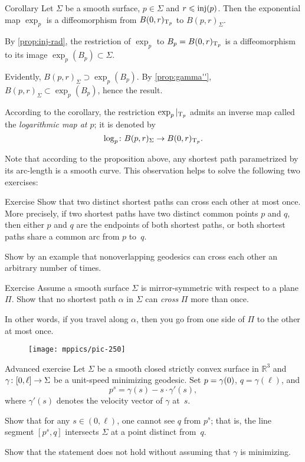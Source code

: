 \begin{thm}{Corollary}
Let $\Sigma$ be a smooth surface, $p\in\Sigma$ and $r\z\le \inj(p)$.
Then the exponential map $\exp_p$ is a diffeomorphism from $B(0,r)_{\mathrm{T}_p}$ to $B(p,r)_\Sigma$.
\end{thm}

By \ref{prop:inj-rad}, the restriction of $\exp_p$ to $B_p={B(0,r)_{\mathrm{T}_p}}$ is a diffeomorphism to its image $\exp_p(B_p)\subset \Sigma$.

Evidently, $B(p,r)_\Sigma\supset\exp_p(B_p)$.
By \ref{prop:gamma''}, $B(p,r)_\Sigma\subset\exp_p(B_p)$, hence the result.
\qeds

According to the corollary, the restriction $\exp_p|_{\mathrm{T}_p}$ admits an inverse map called the \emph{logarithmic map at $p$};
it is denoted by \[\log_p\colon B(p,r)_\Sigma\to B(0,r)_{\mathrm{T}_p}.\]

Note that according to the proposition above, any shortest path parametrized by its arc-length is a smooth curve.
This observation helps to solve the following two exercises:

\begin{thm}{Exercise}\label{ex:two-min-geod}
Show that two distinct shortest paths can cross each other at most once.
More precisely, if two shortest paths have two distinct common points $p$ and $q$, then either $p$ and $q$ are the endpoints of both shortest paths, or both shortest paths share a common arc from $p$ to~$q$.

Show by an example that nonoverlapping geodesics can cross each other an arbitrary number of times.
\end{thm}

\begin{thm}{Exercise}\label{ex:min-geod+plane}
Assume a smooth surface $\Sigma$ is mirror-symmetric with respect to a plane $\Pi$.
Show that no shortest path $\alpha$ in $\Sigma$ can {}\emph{cross} $\Pi$ more than once.


In other words, if you travel along $\alpha$, then you go from one side of $\Pi$ to the other at most once. 
\end{thm}

{

\begin{wrapfigure}{r}{40 mm}
\vskip-10mm
\centering
\texttt{[image: mppics/pic-250]}
\vskip-0mm
\end{wrapfigure}

\begin{thm}{Advanced exercise}\label{ex:milka}
Let $\Sigma$ be a smooth closed strictly convex surface 
in $\mathbb{R}^3$ 
and $\gamma\:[0,\ell]\z\to \Sigma$ be a unit-speed minimizing geodesic.
Set $p\z=\gamma(0)$, $q=\gamma(\ell)$, and 
$$p^s=\gamma(s)-s\cdot\gamma'(s),$$ 
where $\gamma'(s)$ denotes the velocity vector of $\gamma$ at~$s$.

Show that for any $s\in (0,\ell)$,
one cannot see $q$ from $p^s$;
that is, the line segment $[p^s,q]$ intersects $\Sigma$ at a point distinct from~$q$.

Show that the statement does not hold without assuming that $\gamma$ is minimizing.
\end{thm}

}

